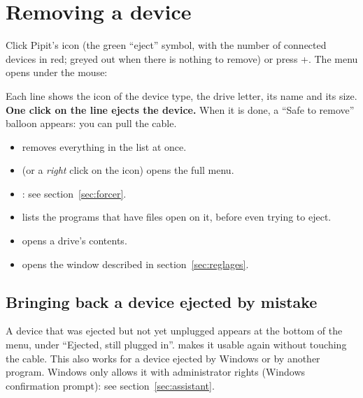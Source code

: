
\section{Removing a device}\label{sec:retirer}

Click Pipit's icon (the green “eject” symbol, with the number of connected devices in red;
greyed out when there is nothing to remove) or press +. The menu
opens under the mouse:


Each line shows the icon of the device type, the drive letter, its name and its size. \textbf{One click on the line
ejects the device.} When it is done, a “Safe to remove” balloon appears: you can pull
the cable.

\begin{itemize}
\item {} removes everything in the list at once.
\item {} (or a \emph{right} click on the icon) opens the full menu.
\end{itemize}


\begin{itemize}
\item {}: see section~\ref{sec:forcer}.
\item {} lists the programs that have files open on it,
  before even trying to eject.
\item {} opens a drive's contents.
\item {} opens the window described in section~\ref{sec:reglages}.
\end{itemize}

\subsection{Bringing back a device ejected by mistake}
A device that was ejected but not yet unplugged appears at the bottom of the menu, under
“Ejected, still plugged in”.  makes it usable again without touching the
cable. This also works for a device ejected by Windows or by another program. Windows only
allows it with administrator rights (Windows confirmation prompt): see section~\ref{sec:assistant}.

